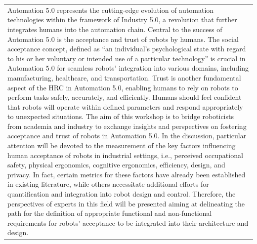 \documentclass[
	openany, %
	parskip=full, %
	12pt, %
	a4paper, %
]{conferencebooklet} %
\begin{document}
\begin{table}[h!]
{\begin{tabular}{p{113mm}}
            Automation 5.0 represents the cutting-edge evolution of automation technologies within the framework of Industry 5.0, a revolution that further integrates humans into the automation chain. Central to the success of Automation 5.0 is the acceptance and trust of robots by humans. The social acceptance concept, defined as “an individual’s psychological state with regard to his or her voluntary or intended use of a particular technology” is crucial in Automation 5.0 for seamless robots’ integration into various domains, including manufacturing, healthcare, and transportation. Trust is another fundamental aspect of the HRC in Automation 5.0, enabling humans to rely on robots to perform tasks safely, accurately, and efficiently. Humans should feel confident that robots will operate within defined parameters and respond appropriately to unexpected situations. The aim of this workshop is to bridge roboticists from academia and industry to exchange insights and perspectives on fostering acceptance and trust of robots in Automation 5.0. In the discussion, particular attention will be devoted to the measurement of the key factors influencing human acceptance of robots in industrial settings, i.e., perceived occupational safety, physical ergonomics, cognitive ergonomics, efficiency, design, and privacy. In fact, certain metrics for these factors have already been established in existing literature, while others necessitate additional efforts for quantification and integration into robot design and control. Therefore, the perspectives of experts in this field will be presented aiming at delineating the path for the definition of appropriate functional and non-functional requirements for robots’ acceptance to be integrated into their architecture and design.
        \end{tabular}
    }
\end{table}

\end{document}
